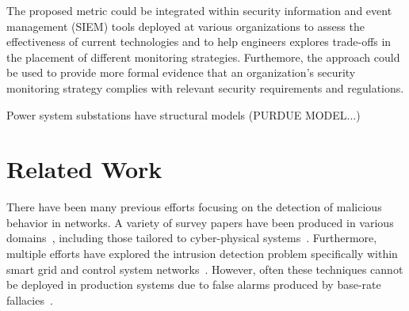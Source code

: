 \documentclass[journal]{IEEEtran}
\begin{document}
The proposed metric could be integrated within security information and event management (SIEM) tools deployed at various organizations to assess the effectiveness of current technologies and to help engineers explores trade-offs in the placement of different monitoring strategies. Furthemore, the approach could be used to provide more formal evidence that an organization's security monitoring strategy complies with relevant security requirements and regulations. 


\color{red} Power system substations have structural models (PURDUE MODEL...) \color{black}






\section{Related Work}
There have been many previous efforts focusing on the detection of malicious behavior in networks. A variety of survey papers have been produced in various domains~\cite{4693640}, including those tailored to cyber-physical systems~\cite{Mitchell:2014:SID:2597757.2542049}. Furthermore, multiple efforts have explored the intrusion detection problem specifically within smart grid and control system networks~\cite{Lin:2013:ABS:2459976.2459982}. However, often these techniques cannot be deployed in production systems due to false alarms produced by base-rate fallacies~\cite{Axelsson}.
\end{document}
